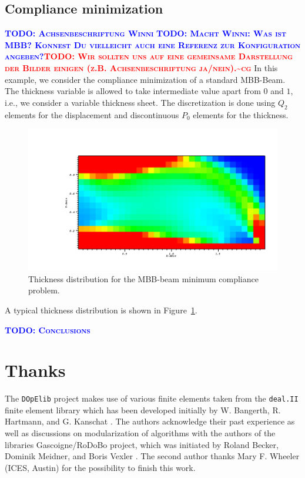 \documentclass[prodmode,acmtoms]{acmsmall}
\numberwithin{equation}{section}
\newcommand{\deal}{\texttt{deal.II}}
\newcommand{\dope}{\texttt{DOpElib}}
\newcommand{\todo}[1]{\textbf{\textsc{\textcolor{blue}{TODO: #1}}}}
\newcommand{\todocg}[1]{\textbf{\textsc{\textcolor{red}{TODO: #1\textasciitilde cg}}}}
\begin{document}
\subsection{Compliance minimization}
\todo{Achsenbeschriftung Winni}
\todo{Macht Winni: Was ist MBB? Konnest Du vielleicht auch eine Referenz zur Konfiguration angeben?}\todocg{Wir sollten uns auf eine gemeinsame Darstellung der Bilder einigen (z.B. Achsenbeschriftung ja/nein).}
In this example, we consider the compliance minimization of a standard MBB-Beam. 
The thickness variable is allowed to take intermediate value apart from $0$ and $1$,
i.e., we consider a variable thickness sheet. The discretization is done 
using $Q_2$ elements for the displacement and discontinuous $P_0$ elements for the 
thickness.
\begin{figure}
\centering
\includegraphics[width=1.\textwidth, viewport=150 0 1024 500, clip]{Pictures/MBB.png}
\caption{Thickness distribution for the MBB-beam minimum compliance problem.} 
\label{res:mbb}
\end{figure}
A typical thickness distribution is shown in Figure~\ref{res:mbb}.

\todo{Conclusions}


\section*{Thanks}
The \dope{} project makes use of various finite elements taken from  
the \deal{} \cite{dealnew} finite element library which has been developed
 initially by W. Bangerth, R. Hartmann, and G. Kanschat \cite{dealold}.
The authors acknowledge their past experience as well as discussions 
on modularization of algorithms
with 
the authors of the libraries 
Gascoigne/RoDoBo project, which was initiated by 
Roland Becker, Dominik Meidner, and Boris Vexler \cite{rodobo}. 
The second author thanks Mary F. Wheeler (ICES, Austin) for the 
possibility to finish this work.

%


%
\end{document}

